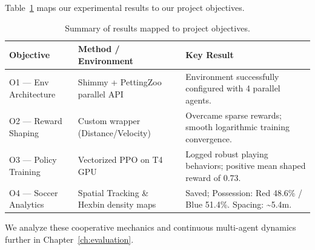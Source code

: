 Table~\ref{tab:results-summary} maps our experimental results to our project objectives.

\begin{table}[!ht]
    \centering
    \caption{Summary of results mapped to project objectives.}
    \label{tab:results-summary}
    \begin{tabular}{p{3.5cm} p{4.5cm} p{6.5cm}}
        \toprule
        \textbf{Objective} & \textbf{Method / Environment} & \textbf{Key Result} \\
        \midrule
        O1 — Env Architecture 
            & Shimmy + PettingZoo parallel API 
            & Environment successfully configured with 4 parallel agents. \\
        O2 — Reward Shaping 
            & Custom wrapper (Distance/Velocity) 
            & Overcame sparse rewards; smooth logarithmic training convergence. \\
        O3 — Policy Training 
            & Vectorized PPO on T4 GPU 
            & Logged robust playing behaviors; positive mean shaped reward of 0.73. \\
        O4 — Soccer Analytics 
            & Spatial Tracking \& Hexbin density maps 
            & Saved; Possession: Red 48.6\% / Blue 51.4\%. Spacing: \textasciitilde5.4m. \\
        \bottomrule
    \end{tabular}
\end{table}

We analyze these cooperative mechanics and continuous multi-agent dynamics further in Chapter~\ref{ch:evaluation}.
